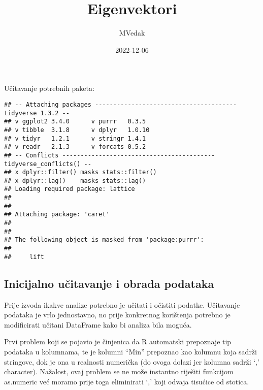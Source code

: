 \documentclass[
]{article}
\title{Eigenvektori}
\author{MVedak}
\date{2022-12-06}
\newenvironment{Shaded}{\begin{snugshade}}{\end{snugshade}}
\newcommand{\AttributeTok}[1]{\textcolor[rgb]{0.77,0.63,0.00}{#1}}
\newcommand{\ConstantTok}[1]{\textcolor[rgb]{0.00,0.00,0.00}{#1}}
\newcommand{\FunctionTok}[1]{\textcolor[rgb]{0.00,0.00,0.00}{#1}}
\newcommand{\NormalTok}[1]{#1}
\newcommand{\OtherTok}[1]{\textcolor[rgb]{0.56,0.35,0.01}{#1}}
\newcommand{\SpecialCharTok}[1]{\textcolor[rgb]{0.00,0.00,0.00}{#1}}
\newcommand{\StringTok}[1]{\textcolor[rgb]{0.31,0.60,0.02}{#1}}
\begin{document}
\maketitle

Učitavanje potrebnih paketa:

\begin{verbatim}
## -- Attaching packages --------------------------------------- tidyverse 1.3.2 --
## v ggplot2 3.4.0      v purrr   0.3.5 
## v tibble  3.1.8      v dplyr   1.0.10
## v tidyr   1.2.1      v stringr 1.4.1 
## v readr   2.1.3      v forcats 0.5.2 
## -- Conflicts ------------------------------------------ tidyverse_conflicts() --
## x dplyr::filter() masks stats::filter()
## x dplyr::lag()    masks stats::lag()
## Loading required package: lattice
## 
## 
## Attaching package: 'caret'
## 
## 
## The following object is masked from 'package:purrr':
## 
##     lift
\end{verbatim}

\hypertarget{inicijalno-uux10ditavanje-i-obrada-podataka}{%
\subsection{Inicijalno učitavanje i obrada
podataka}\label{inicijalno-uux10ditavanje-i-obrada-podataka}}

Prije izvoda ikakve analize potrebno je učitati i očistiti podatke.
Učitavanje podataka je vrlo jednostavno, no prije konkretnog korištenja
potrebno je modificirati učitani DataFrame kako bi analiza bila moguća.

Prvi problem koji se pojavio je činjenica da R automatski prepoznaje tip
podataka u kolumnama, te je kolumni ``Min'' prepoznao kao kolumnu koja
sadrži stringove, dok je ona u realnosti numerička (do ovoga dolazi jer
kolumna sadrži `,' character). Nažalost, ovaj problem se ne može
instantno riješiti funkcijom as.numeric već moramo prije toga
eliminirati `,' koji odvaja tisućice od stotica.

\begin{Shaded}
\end{Shaded}
\end{document}
